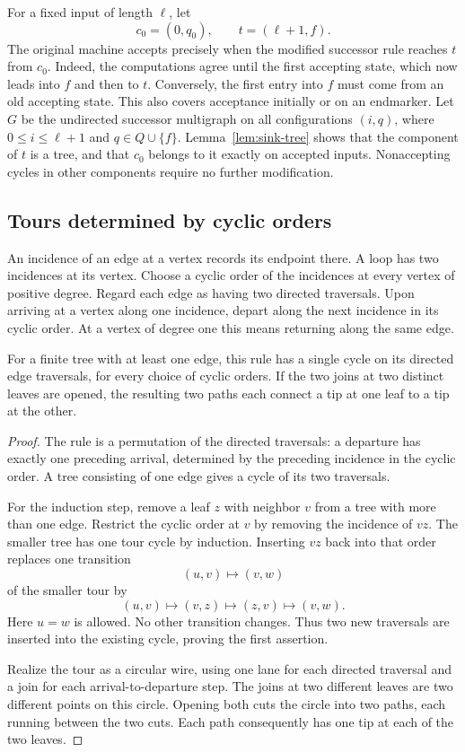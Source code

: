For a fixed input of length $\ell$, let
\[
 c_0=(0,q_0),\qquad t=(\ell+1,f).
\]
The original machine accepts precisely when the modified successor
rule reaches $t$ from $c_0$.  Indeed, the computations agree until
the first accepting state, which now leads into $f$ and then to $t$.
Conversely, the first entry into $f$ must come from an old accepting
state.  This also covers acceptance initially or on an endmarker.
Let $G$ be the undirected successor multigraph on all configurations
$(i,q)$, where $0\le i\le\ell+1$ and $q\in Q\cup\{f\}$.
Lemma~\ref{lem:sink-tree} shows that the component of $t$ is a tree,
and that $c_0$ belongs to it exactly on accepted inputs.  Nonaccepting
cycles in other components require no further modification.

\subsection{Tours determined by cyclic orders}

An incidence of an edge at a vertex records its endpoint there.
A loop has two incidences at its vertex.  Choose a cyclic order of
the incidences at every vertex of positive degree.  Regard each edge
as having two directed traversals.  Upon arriving at a vertex along
one incidence, depart along the next incidence in its cyclic order.
At a vertex of degree one this means returning along the same edge.

\begin{lemma}
\label{lem:tree-tour}
For a finite tree with at least one edge, this rule has a single
cycle on its directed edge traversals, for every choice of cyclic
orders.  If the two joins at two distinct leaves are opened, the
resulting two paths each connect a tip at one leaf to a tip at the
other.
\end{lemma}

\begin{proof}
The rule is a permutation of the directed traversals: a departure
has exactly one preceding arrival, determined by the preceding
incidence in the cyclic order.  A tree consisting of one edge gives
a cycle of its two traversals.

For the induction step, remove a leaf $z$ with neighbor $v$ from
a tree with more than one edge.  Restrict the cyclic order at $v$
by removing the incidence of $vz$.  The smaller tree has one tour
cycle by induction.  Inserting $vz$ back into that order replaces
one transition
\[
 (u,v)\longmapsto(v,w)
\]
of the smaller tour by
\[
 (u,v)\longmapsto(v,z)\longmapsto(z,v)\longmapsto(v,w).
\]
Here $u=w$ is allowed.  No other transition changes.  Thus two new
traversals are inserted into the existing cycle, proving the first
assertion.

Realize the tour as a circular wire, using one lane for each
directed traversal and a join for each arrival-to-departure step.
The joins at two different leaves are two different points on this
circle.  Opening both cuts the circle into two paths, each running
between the two cuts.  Each path consequently has one tip at each
of the two leaves.
\end{proof}

